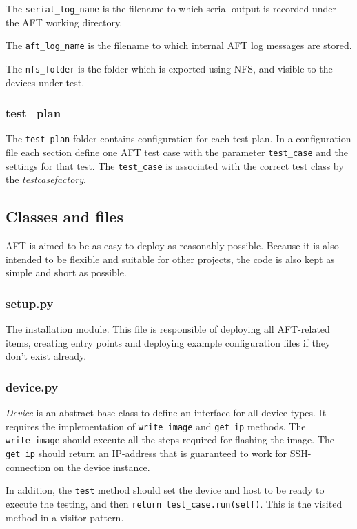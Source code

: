\documentclass[a4paper,11pt]{article}
\newcommand{\cmd}[1]{\texttt{#1}}
\begin{document}
The \cmd{serial\_log\_name} is the filename to which serial output is recorded under the AFT working directory.

The \cmd{aft\_log\_name} is the filename to which internal AFT log messages are stored.

The \cmd{nfs\_folder} is the folder which is exported using NFS, and visible to the devices under test.

\subsubsection*{test\_plan}
The \cmd{test\_plan} folder contains configuration for each test plan. In a configuration file each section define one AFT test case with the parameter \cmd{test\_case} and the settings for that test. The \cmd{test\_case} is associated with the correct test class by the \emph{testcasefactory}.

\subsection{Classes and files}

AFT is aimed to be as easy to deploy as reasonably possible. Because it is also intended to be flexible and suitable for other projects, the code is also kept as simple and short as possible.

\subsubsection*{setup.py}
The installation module. This file is responsible of deploying all AFT-related items, creating entry points and deploying example configuration files if they don't exist already.

\subsubsection*{device.py}
\emph{Device} is an abstract base class to define an interface for all device types. It requires the implementation of \cmd{write\_image} and \cmd{get\_ip} methods. The \cmd{write\_image} should execute all the steps required for flashing the image. The \cmd{get\_ip} should return an IP-address that is guaranteed to work for SSH-connection on the device instance.

In addition, the \cmd{test} method should set the device and host to be ready to execute the testing, and then \cmd{return test\_case.run(self)}. This is the visited method in a visitor pattern.
\end{document}
